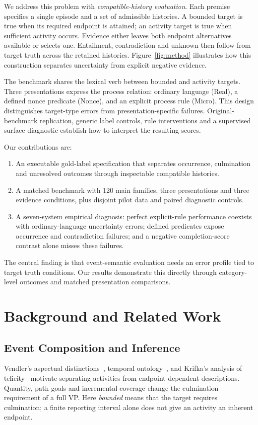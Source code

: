 \documentclass[sigconf,anonymous,review]{acmart}
\begin{document}
We address this problem with \emph{compatible-history evaluation}. Each premise specifies a single episode and a set of admissible histories. A bounded target is true when its required endpoint is attained; an activity target is true when sufficient activity occurs. Evidence either leaves both endpoint alternatives available or selects one. Entailment, contradiction and unknown then follow from target truth across the retained histories. Figure~\ref{fig:method} illustrates how this construction separates uncertainty from explicit negative evidence.

The benchmark shares the lexical verb between bounded and activity targets. Three presentations express the process relation: ordinary language (Real), a defined nonce predicate (Nonce), and an explicit process rule (Micro). This design distinguishes target-type errors from presentation-specific failures. Original-benchmark replication, generic label controls, rule interventions and a supervised surface diagnostic establish how to interpret the resulting scores.

Our contributions are:
\begin{enumerate}
\item An executable gold-label specification that separates occurrence, culmination and unresolved outcomes through inspectable compatible histories.
\item A matched benchmark with 120 main families, three presentations and three evidence conditions, plus disjoint pilot data and paired diagnostic controls.
\item A seven-system empirical diagnosis: perfect explicit-rule performance coexists with ordinary-language uncertainty errors; defined predicates expose occurrence and contradiction failures; and a negative completion-score contrast alone misses these failures.
\end{enumerate}
The central finding is that event-semantic evaluation needs an error profile tied to target truth conditions. Our results demonstrate this directly through category-level outcomes and matched presentation comparisons.

\section{Background and Related Work}
\subsection{Event Composition and Inference}
Vendler's aspectual distinctions~\cite{vendler1957}, temporal ontology~\cite{moens1988}, and Krifka's analysis of telicity~\cite{krifka1998} motivate separating activities from endpoint-dependent descriptions. Quantity, path goals and incremental coverage change the culmination requirement of a full VP. Here \emph{bounded} means that the target requires culmination; a finite reporting interval alone does not give an activity an inherent endpoint.
\end{document}
